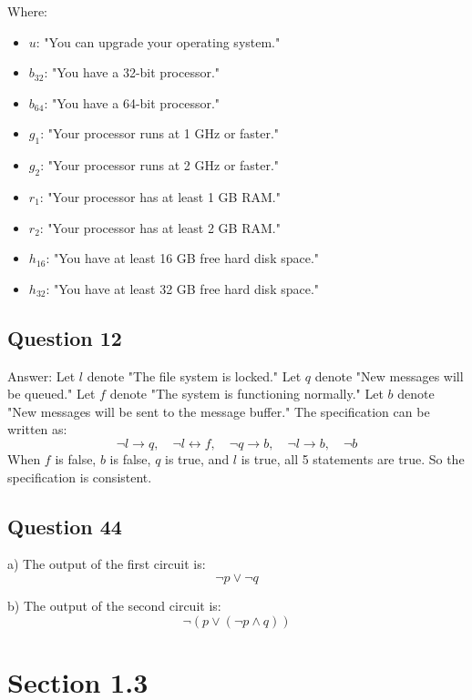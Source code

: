 \documentclass{article}
\begin{document}
Where:
\begin{itemize}
    \item \( u \): "You can upgrade your operating system."
    \item \( b_{32} \): "You have a 32-bit processor."
    \item \( b_{64} \): "You have a 64-bit processor."
    \item \( g_1 \): "Your processor runs at 1 GHz or faster."
    \item \( g_2 \): "Your processor runs at 2 GHz or faster."
    \item \( r_1 \): "Your processor has at least 1 GB RAM."
    \item \( r_2 \): "Your processor has at least 2 GB RAM."
    \item \( h_{16} \): "You have at least 16 GB free hard disk space."
    \item \( h_{32} \): "You have at least 32 GB free hard disk space."
\end{itemize}

\subsection*{Question 12}
Answer: Let \( l \) denote "The file system is locked." Let \( q \) denote "New messages will be queued." Let \( f \) denote "The system is functioning normally." Let \( b \) denote "New messages will be sent to the message buffer." The specification can be written as:
\[
\neg l \to q, \quad \neg l \leftrightarrow f, \quad \neg q \to b, \quad \neg l \to b, \quad \neg b
\]
When \( f \) is false, \( b \) is false, \( q \) is true, and \( l \) is true, all 5 statements are true. So the specification is consistent.

\subsection*{Question 44}

a) The output of the first circuit is:
\[
\neg p \lor \neg q
\]

b) The output of the second circuit is:
\[
\neg (p \lor (\neg p \land q))
\]

\section*{Section 1.3}

\end{document}
